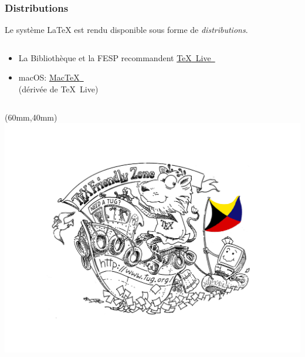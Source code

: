 \documentclass[aspectratio=54,10pt,xcolor=x11names]{beamer}
\newcommand{\link}[2]{\href{#1}{#2~\raisebox{-0.2ex}{\faExternalLink}}}
\theoremstyle{example}
\begin{document}
\begin{frame}
  \frametitle{Distributions}

  Le système {\LaTeX} est rendu disponible sous forme de \emph{distributions}.

  \begin{columns}
    \begin{column}{.58\textwidth}
      \begin{itemize}
      \item La Bibliothèque et la FESP recommandent %
        \link{https://www.tug.org/texlive}{{\TeX}~Live}
      \item macOS: %
        \link{https://www.tug.org/mactex}{Mac{\TeX}} \\ %
        (dérivée de {\TeX}~Live)
      \end{itemize}
    \end{column}
    \begin{column}{.42\textwidth}
    \end{column}
  \end{columns}
  \begin{textblock*}{70mm}(60mm,40mm)
    \includegraphics[width=\linewidth]{TeXFZoneColor}
  \end{textblock*}
\end{frame}
\end{document}

